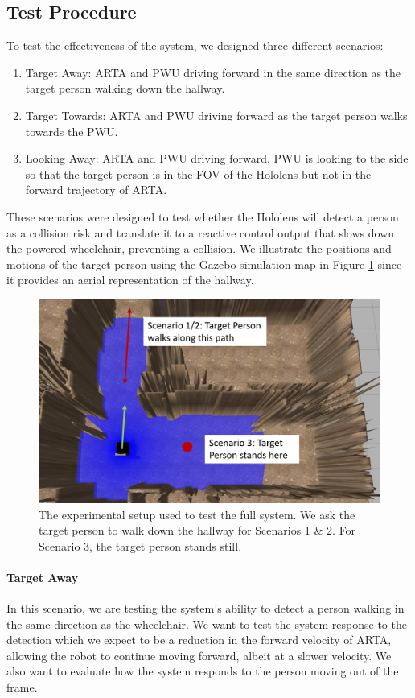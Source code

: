 \subsection{Test Procedure}
To test the effectiveness of the system, we designed three different scenarios:

\begin{enumerate}
    \item Target Away: ARTA and PWU driving forward in the same direction as the target person walking down the hallway.
    \item Target Towards: ARTA and PWU driving forward as the target person walks towards the PWU.
    \item Looking Away: ARTA and PWU driving forward, PWU is looking to the side so that the target person is in the FOV of the Hololens but not in the forward trajectory of ARTA.
\end{enumerate}

These scenarios were designed to test whether the Hololens will detect a person as a collision risk and translate it to a reactive control output that slows down the powered wheelchair, preventing a collision. We illustrate the positions and motions of the target person using the Gazebo simulation map in Figure \ref{fig:fullSystemTest} since it provides an aerial representation of the hallway.

\begin{figure}[ht]
    \centering
    \includegraphics[width=0.9\linewidth]{img/chapter6_test/fullSystem.png}
    \caption{The experimental setup used to test the full system. We ask the target person to walk down the hallway for Scenarios 1 \& 2. For Scenario 3, the target person stands still.}
    \label{fig:fullSystemTest}
\end{figure}

\paragraph{Target Away} In this scenario, we are testing the system's ability to detect a person walking in the same direction as the wheelchair. We want to test the system response to the detection which we expect to be a reduction in the forward velocity of ARTA, allowing the robot to continue moving forward, albeit at a slower velocity. We also want to evaluate how the system responds to the person moving out of the frame.

